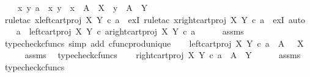 \begin{isabellebody}
\ \ \ {\isachardoublequoteopen}{\isasymexists}\ x\ y{\isachardot}{\kern0pt}\ a\ {\isacharequal}{\kern0pt}\ {\isasymlangle}x{\isacharcomma}{\kern0pt}\ y{\isasymrangle}\ {\isasymand}\ x\ {\isacharcolon}{\kern0pt}\ A\ {\isasymrightarrow}\ X\ {\isasymand}\ y\ {\isacharcolon}{\kern0pt}\ A\ {\isasymrightarrow}\ Y{\isachardoublequoteclose}\isanewline
%
\isadelimproof
%
\endisadelimproof
%
\isatagproof
{}\isamarkupfalse%
\ {\isacharparenleft}{\kern0pt}rule{\isacharunderscore}{\kern0pt}tac\ x{\isacharequal}{\kern0pt}{\isachardoublequoteopen}left{\isacharunderscore}{\kern0pt}cart{\isacharunderscore}{\kern0pt}proj\ X\ Y\ {\isasymcirc}\isactrlsub c\ a{\isachardoublequoteclose}\ \ exI{\isacharcomma}{\kern0pt}\ rule{\isacharunderscore}{\kern0pt}tac\ x{\isacharequal}{\kern0pt}{\isachardoublequoteopen}right{\isacharunderscore}{\kern0pt}cart{\isacharunderscore}{\kern0pt}proj\ X\ Y\ {\isasymcirc}\isactrlsub c\ a{\isachardoublequoteclose}\ \ exI{\isacharcomma}{\kern0pt}\ auto{\isacharparenright}{\kern0pt}\isanewline
\ \ \isamarkupfalse%
\ {\isachardoublequoteopen}a\ {\isacharequal}{\kern0pt}\ {\isasymlangle}left{\isacharunderscore}{\kern0pt}cart{\isacharunderscore}{\kern0pt}proj\ X\ Y\ {\isasymcirc}\isactrlsub c\ a{\isacharcomma}{\kern0pt}right{\isacharunderscore}{\kern0pt}cart{\isacharunderscore}{\kern0pt}proj\ X\ Y\ {\isasymcirc}\isactrlsub c\ a{\isasymrangle}{\isachardoublequoteclose}\isanewline
\ \ \ \ \isamarkupfalse%
\ assms\ \isamarkupfalse%
\ {\isacharparenleft}{\kern0pt}typecheck{\isacharunderscore}{\kern0pt}cfuncs{\isacharcomma}{\kern0pt}\ simp\ add{\isacharcolon}{\kern0pt}\ cfunc{\isacharunderscore}{\kern0pt}prod{\isacharunderscore}{\kern0pt}unique{\isacharparenright}{\kern0pt}\isanewline
\ \ \isamarkupfalse%
\ {\isachardoublequoteopen}left{\isacharunderscore}{\kern0pt}cart{\isacharunderscore}{\kern0pt}proj\ X\ Y\ {\isasymcirc}\isactrlsub c\ a\ {\isacharcolon}{\kern0pt}\ A\ {\isasymrightarrow}\ \ X{\isachardoublequoteclose}\isanewline
\ \ \ \ \isamarkupfalse%
\ assms\ \isamarkupfalse%
\ typecheck{\isacharunderscore}{\kern0pt}cfuncs\isanewline
\ \ \isamarkupfalse%
\ {\isachardoublequoteopen}right{\isacharunderscore}{\kern0pt}cart{\isacharunderscore}{\kern0pt}proj\ X\ Y\ {\isasymcirc}\isactrlsub c\ a\ {\isacharcolon}{\kern0pt}\ A\ {\isasymrightarrow}\ Y{\isachardoublequoteclose}\isanewline
\ \ \ \ \isamarkupfalse%
\ assms\ \isamarkupfalse%
\ typecheck{\isacharunderscore}{\kern0pt}cfuncs\isanewline

\end{isabellebody}
